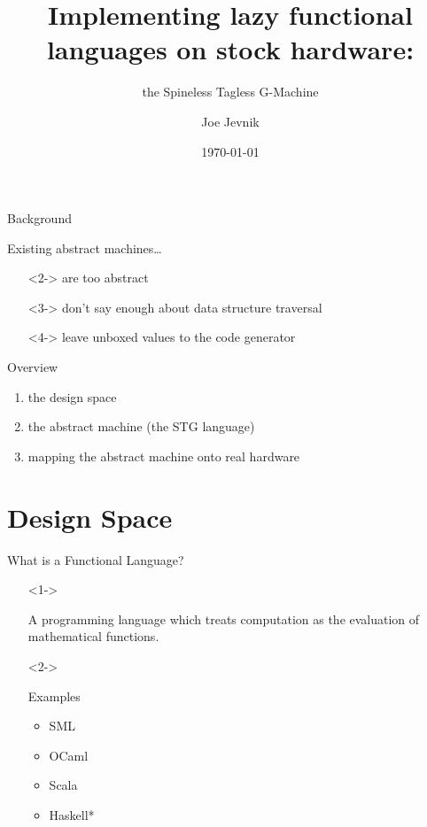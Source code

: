 \documentclass{beamer}
\title{Implementing lazy functional languages on stock hardware:}
\subtitle{the Spineless Tagless G-Machine}
\date{\today}
\author{Joe Jevnik}
\institute{Papers We Love - Boston}
\begin{document}
\maketitle

\begin{frame}{Background}
  \begin{block}{Existing abstract machines\ldots}
    \begin{itemize}
    \item[]<2-> are too abstract
    \item[]<3-> don't say enough about data structure traversal
    \item[]<4-> leave unboxed values to the code generator
    \end{itemize}
  \end{block}
\end{frame}

\begin{frame}{Overview}
  \begin{enumerate}
  \item<1-> the design space
  \item<2-> the abstract machine (the STG language)
  \item<3-> mapping the abstract machine onto real hardware
  \end{enumerate}
\end{frame}

\section{Design Space}

\begin{frame}{What is a Functional Language?}
  \begin{itemize}
  \item[]<1-> \begin{definition}
      A programming language which treats computation as the evaluation of
      mathematical functions.
    \end{definition}
  \item[]<2-> \begin{block}{Examples}
      \begin{itemize}
      \item SML
      \item OCaml
      \item Scala
      \item Haskell*
      \end{itemize}
    \end{block}
  \end{itemize}
\end{frame}
\end{document}
